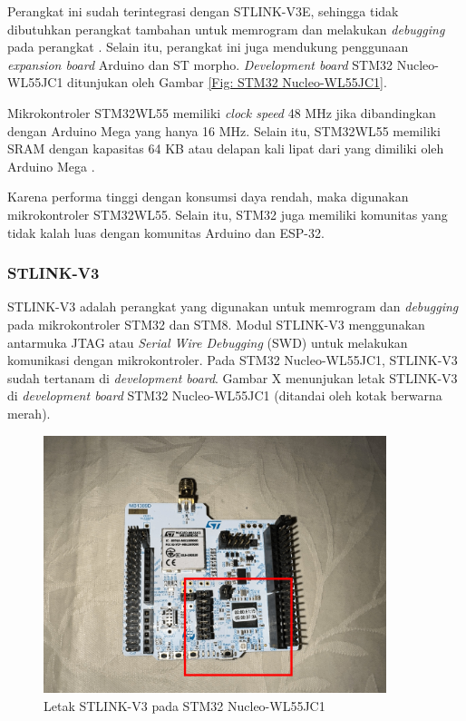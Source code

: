 Perangkat ini sudah terintegrasi dengan STLINK-V3E, sehingga tidak dibutuhkan perangkat tambahan untuk memrogram dan melakukan \textit{debugging} pada perangkat \cite{STMicroelectronics2022}. Selain itu, perangkat ini juga mendukung penggunaan \textit{expansion board} Arduino dan ST morpho. \textit{Development board} STM32 Nucleo-WL55JC1 ditunjukan oleh Gambar \ref{Fig: STM32 Nucleo-WL55JC1}.

Mikrokontroler STM32WL55 memiliki \textit{clock speed} 48 MHz jika dibandingkan dengan Arduino Mega yang hanya 16 MHz. Selain itu, STM32WL55 memiliki SRAM dengan kapasitas 64 KB atau delapan kali lipat dari yang dimiliki oleh Arduino Mega \cite{STMicroelectronics2022b}.

Karena performa tinggi dengan konsumsi daya rendah, maka digunakan mikrokontroler STM32WL55. Selain itu, STM32 juga memiliki komunitas yang tidak kalah luas dengan komunitas Arduino dan ESP-32.

\subsubsection{STLINK-V3}
STLINK-V3 adalah perangkat yang digunakan untuk memrogram dan \textit{debugging} pada mikrokontroler STM32 dan STM8. Modul STLINK-V3 menggunakan antarmuka JTAG atau \textit{Serial Wire Debugging} (SWD) untuk melakukan komunikasi dengan mikrokontroler. Pada STM32 Nucleo-WL55JC1, STLINK-V3 sudah tertanam di \textit{development board}. Gambar X menunjukan letak STLINK-V3 di \textit{development board} STM32 Nucleo-WL55JC1 (ditandai oleh kotak berwarna merah).

\begin{figure}[ht]
	\centering
	\includegraphics[width=10cm]{contents/chapter-2/stlink-in-wl55.jpg}
	\caption{Letak STLINK-V3 pada STM32 Nucleo-WL55JC1}
	\label{Fig: stlink-in-wl55}
\end{figure}

